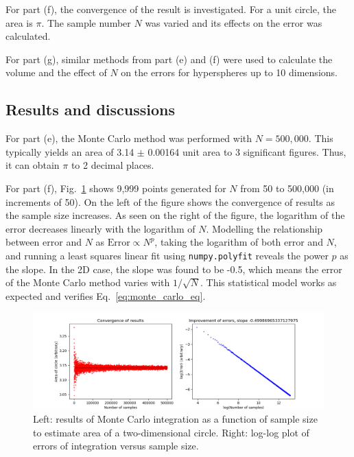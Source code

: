 \documentclass[hyphens,twocolumn,nobalancelastpage,aps,10pt,citeautoscript,longbibliography]{revtex4-2}
\begin{document}
For part (f), the convergence of the result is investigated. For a unit circle,
the area is $\pi$. The sample number $N$ was varied and its effects on the
error was calculated.

For part (g), similar methods from part (e) and (f) were used to calculate the
volume and the effect of $N$ on the errors for hyperspheres up to 10
dimensions.

\subsection{Results and discussions}%
\label{sub:results_and_discussions_2}

\noindent For part (e), the Monte Carlo method was performed with $N=500,000$. This
typically yields an area of 3.14 $\pm$ 0.00164 unit area to 3 significant
figures. Thus, it can obtain $\pi$ to 2 decimal places.

For part (f), Fig.~\ref{fig:mc_2} shows 9,999 points generated for $N$ from 50
to 500,000 (in increments of 50). On the left of the figure shows the
convergence of results as the sample size increases. As seen on the right of
the figure, the logarithm of the error decreases linearly with the logarithm of
$N$. Modelling the relationship between error and $N$ as $\textrm{Error}\propto
	N^p$, taking the logarithm of both error and $N$, and running a least squares
linear fit using \lstinline{numpy.polyfit} reveals the power $p$ as the slope.
In the 2D case, the slope was found to be -0.5, which means the error of the
Monte Carlo method varies with $1/\sqrt{N}$. This statistical model works as
expected and verifies Eq.~\ref{eq:monte_carlo_eq}.

\begin{figure}[htpb] \centering
	\includegraphics[width=1\linewidth]{./assets/monte_carlo/mc_2.png}
	\caption{Left: results of Monte Carlo integration as a function of sample size to estimate area of a two-dimensional circle. Right: log-log plot of errors of integration versus sample size.}%
	\label{fig:mc_2}
\end{figure}
\end{document}
